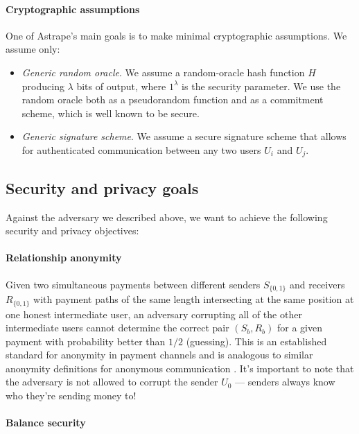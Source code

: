 \documentclass[USenglish,oneside,twocolumn]{article}
\begin{document}
\paragraph*{Cryptographic assumptions} One of Astrape's main goals is to make minimal cryptographic assumptions. We assume only:

\begin{itemize}
    \item \emph{Generic random oracle}. We assume a random-oracle hash function $H$ producing $\lambda$ bits of output, where $1^\lambda$ is the security parameter. We use the random oracle both as a pseudorandom function and as a commitment scheme, which is well known \cite{camenisch2018wonderful} to be secure.
    \item \emph{Generic signature scheme}. We assume a secure signature scheme that allows for authenticated communication between any two users $U_i$ and $U_j$.
\end{itemize}

\subsection{Security and privacy goals}

Against the adversary we described above, we want to achieve the following security and privacy objectives:

\paragraph*{Relationship anonymity}

Given two simultaneous payments between different senders $S_{\{ 0,1 \}}$ and receivers $R_{\{ 0,1\} }$ with payment paths of the same length intersecting at the same position at one honest intermediate user, an adversary corrupting all of the other intermediate users cannot determine the correct pair $(S_{b},R_b)$ for a given payment with probability better than $1/2$ (guessing). This is an established standard for anonymity in payment channels \cite{malavolta2017concurrency,malavolta2019anonymous} and is analogous to similar anonymity definitions for anonymous communication \cite{pfitzmann2010terminology, backes2013anoa}. It's important to note that the adversary is not allowed to corrupt the sender $U_0$ --- senders always know who they're sending money to!

\paragraph*{Balance security}
\end{document}
